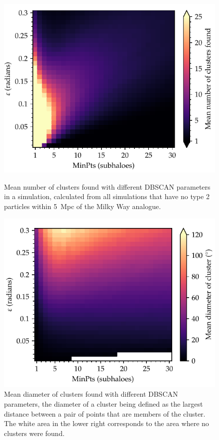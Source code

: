 \documentclass[english, oneside]{HYgradu}
\begin{document}
\begin{figure}
    \centering
    \includegraphics{kuvat/clusteringParameters.pdf}
    \caption{Mean number of clusters found with different DBSCAN parameters in a simulation, calculated from all simulations that have no type 2 particles within 5~Mpc of the Milky Way analogue.}\label{fig:clusteringparameters}

	\bigskip

    \includegraphics{kuvat/clusterDiameter.pdf}
    \caption{Mean diameter of clusters found with different DBSCAN parameters, the diameter of a cluster being defined as the largest distance between a pair of points that are members of the cluster. The white area in the lower right corresponds to the area where no clusters were found. }\label{fig:clusterdiameter}
\end{figure}
\end{document}

